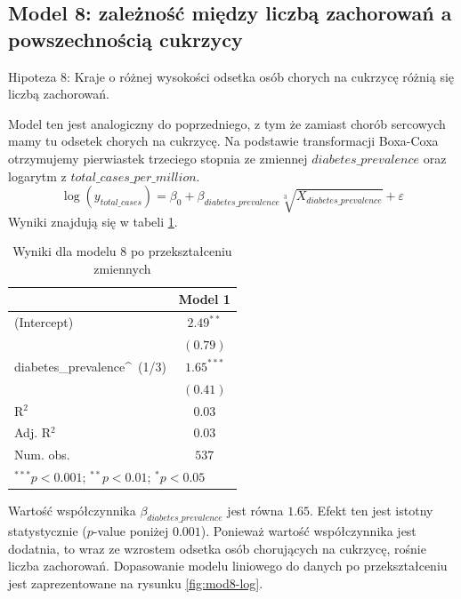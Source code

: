 \documentclass[12pt]{mwbk}
\theoremstyle{plain}
\theoremstyle{definition}
\theoremstyle{remark}
\begin{document}
\subsection{Model 8: zależność między liczbą zachorowań a powszechnością cukrzycy}

Hipoteza 8: Kraje o różnej wysokości odsetka osób chorych na cukrzycę różnią się liczbą zachorowań.


Model ten jest analogiczny do poprzedniego, z tym że zamiast chorób sercowych mamy tu odsetek chorych na cukrzycę.
Na podstawie transformacji Boxa-Coxa otrzymujemy pierwiastek trzeciego stopnia ze zmiennej $diabetes\_prevalence$ oraz logarytm z $total\_cases\_per\_million$.
$$\log(y_{total\_cases})=\beta_0+\beta_{diabetes\_prevalence}\sqrt[3]{X_{diabetes\_prevalence}}+\varepsilon$$
Wyniki znajdują się w tabeli \ref{table:mod8-log}.

\begin{table}[htbp]
	\begin{center}
		\begin{tabular}{l c}
			\hline
			& Model 1 \\
			\hline
			(Intercept)                & $2.49^{**}$  \\
			& $(0.79)$     \\
			diabetes\_prevalence\^~(1/3) & $1.65^{***}$ \\
			& $(0.41)$     \\
			\hline
			R$^2$                      & $0.03$       \\
			Adj. R$^2$                 & $0.03$       \\
			Num. obs.                  & $537$        \\
			\hline
			\multicolumn{2}{l}{\scriptsize{$^{***}p<0.001$; $^{**}p<0.01$; $^{*}p<0.05$}}
		\end{tabular}
		\caption{Wyniki dla modelu 8 po przekształceniu zmiennych}
		\label{table:mod8-log}
	\end{center}
\end{table}

Wartość współczynnika $\beta_{diabetes\_prevalence}$ jest równa $1.65$. Efekt ten jest istotny statystycznie ($p$-value poniżej $0.001$). Ponieważ wartość współczynnika jest dodatnia, to wraz ze wzrostem odsetka osób chorujących na cukrzycę, rośnie liczba zachorowań. Dopasowanie modelu liniowego do danych po przekształceniu jest zaprezentowane na rysunku \ref{fig:mod8-log}.
\end{document}
